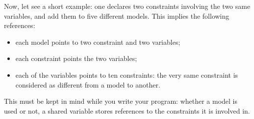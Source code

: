 Now, let see a short example: one declares two constraints involving the two same variables, and add them to five different models. This implies the following references:
\begin{itemize}
\item each model points to two constraint and two variables;
\item each constraint points the two variables;
\item each of the variables points to ten constraints: the very same constraint is considered as different from a model to another.  
\end{itemize}

This must be kept in mind while you write your program: whether a model is used or not, a shared variable stores references to the constraints it is involved in. 

